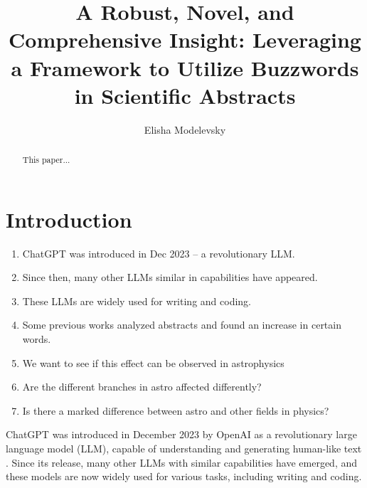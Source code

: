 \documentclass[twocolumn]{aastex701}
\begin{document}
\title{A Robust, Novel, and Comprehensive Insight: Leveraging a Framework to Utilize Buzzwords in Scientific Abstracts}

\author[orcid=0000-0003-4105-3443]{Elisha Modelevsky}

\begin{abstract}

This paper...

\end{abstract}


\section{Introduction} 

\begin{enumerate}
    \item ChatGPT was introduced in Dec 2023 -- a revolutionary LLM.
    \item Since then, many other LLMs similar in capabilities have appeared.
    \item These LLMs are widely used for writing and coding.
    \item Some previous works analyzed abstracts and found an increase in certain words.
    \item We want to see if this effect can be observed in astrophysics
    \item Are the different branches in astro affected differently?
    \item Is there a marked difference between astro and other fields in physics?
\end{enumerate}

ChatGPT was introduced in December 2023 by OpenAI as a revolutionary large language model (LLM), capable of understanding and generating human-like text \cite{Roumeliotis2023}.
Since its release, many other LLMs with similar capabilities have emerged, and these models are now widely used for various tasks, including writing and coding.
\end{document}
